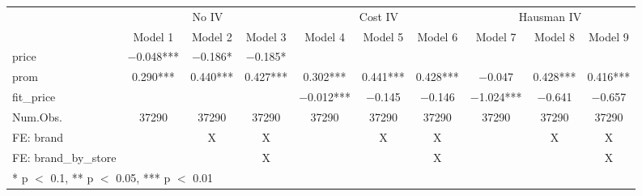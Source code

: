 \begin{table}
\centering
\begin{tabular}[t]{lccccccccc}
\toprule
\multicolumn{1}{c}{ } & \multicolumn{3}{c}{No IV} & \multicolumn{3}{c}{Cost IV} & \multicolumn{3}{c}{Hausman IV} \\
\cmidrule(l{3pt}r{3pt}){2-4} \cmidrule(l{3pt}r{3pt}){5-7} \cmidrule(l{3pt}r{3pt}){8-10}
  & Model 1 & Model 2 & Model 3 & Model 4 & Model 5 & Model 6 & Model 7 & Model 8 & Model 9\\
\midrule
price & \num{-0.048}*** & \num{-0.186}* & \num{-0.185}* &  &  &  &  &  & \\
prom & \num{0.290}*** & \num{0.440}*** & \num{0.427}*** & \num{0.302}*** & \num{0.441}*** & \num{0.428}*** & \num{-0.047} & \num{0.428}*** & \num{0.416}***\\
fit\_price &  &  &  & \num{-0.012}*** & \num{-0.145} & \num{-0.146} & \num{-1.024}*** & \num{-0.641} & \num{-0.657}\\
\midrule
Num.Obs. & \num{37290} & \num{37290} & \num{37290} & \num{37290} & \num{37290} & \num{37290} & \num{37290} & \num{37290} & \num{37290}\\
FE: brand &  & X & X &  & X & X &  & X & X\\
FE: brand_by_store &  &  & X &  &  & X &  &  & X\\
\bottomrule
\multicolumn{10}{l}{\rule{0pt}{1em}* p $<$ 0.1, ** p $<$ 0.05, *** p $<$ 0.01}\\
\end{tabular}
\end{table}

